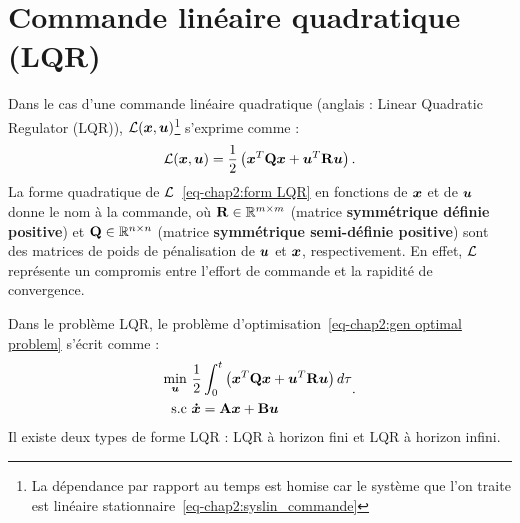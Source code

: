 \section{Commande linéaire quadratique (LQR)}
Dans le cas d'une commande linéaire quadratique (anglais : Linear Quadratic Regulator (LQR)), ${\cal L}(\bm{x},\bm{u})$\footnote{La dépendance par rapport au temps est homise car le système que l'on traite est linéaire stationnaire~\eqref{eq-chap2:syslin_commande}} s'exprime comme : 
\begin{equation}\label{eq-chap2:form LQR}
	{\cal L}(\bm{x},\bm{u}) = \frac{1}{2}\left(\bm{x}^T\mathbf{Q}\bm{x} + \bm{u}^T\mathbf{R}\bm{u}\right).
\end{equation}
La forme quadratique de ${\cal L}$~\eqref{eq-chap2:form LQR} en fonctions de $\bm{x}$ et de $\bm{u}$ donne le nom à la commande, où $\mathbf{R}\in \mathbb{R}^{m\times m}$ (matrice \textbf{symmétrique définie positive}) et $\mathbf{Q}\in \mathbb{R}^{n\times n}$ (matrice \textbf{symmétrique semi-définie positive}) sont des matrices de poids de pénalisation de $\bm{u}$ et $\bm{x}$, respectivement. En effet, ${\cal L}$ représente un compromis entre l'effort de commande et la rapidité de convergence.

Dans le problème LQR, le problème d'optimisation~\eqref{eq-chap2:gen optimal problem} s'écrit comme : 
 \begin{align}\label{eq-chap2:LQR optimal problem}
 	\begin{split}
 		\underset{\bm{u}}{\min}~&\frac{1}{2}\int_0^t\left(\bm{x}^T\mathbf{Q}\bm{x} + \bm{u}^T\mathbf{R}\bm{u} \right)d\tau\\
 		{\rm s.c}~&\bm{\dot{x}} = \mathbf{A}\bm{x}+\mathbf{B}\bm{u}
 	\end{split}.
 \end{align}
Il existe deux types de forme LQR : LQR à horizon fini et LQR à horizon infini.

